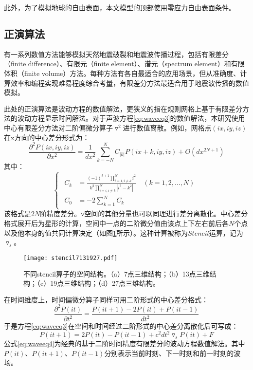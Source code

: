 此外，为了模拟地球的自由表面，本文模型的顶部使用零应力自由表面条件\cite{gottschammer2001accuracy}。

\subsection{正演算法} %
有一系列数值方法能够模拟天然地震破裂和地震波传播过程，包括有限差分（finite difference）、有限元（finite element）、谱元（spectrum element）和有限体积（finite volume）方法。每种方法有各自最适合的应用场景，但从准确度、计算效率和编程实现难易程度综合考量，有限差分方法最适合用于地震波传播的数值模拟。

此处的正演算法是波动方程的数值解法，更狭义的指在规则网格上基于有限差分方法的波动方程显示时间解法。对于声波方程\ref{eq:waveeq3}的数值解法，本研究使用中心有限差分方法对二阶偏微分算子$\triangledown ^2$进行数值离散。例如，网格点$(ix, iy, iz)$在x方向的中心差分形式为：
\begin{equation}
  \frac{\partial ^2 P(ix, iy, iz)}{\partial x^2}=\frac{1}{dx^2}\sum_{k=-N}^N C_{|k|}P(ix+k, iy, iz)+O(dx^{2N+1})
\end{equation}
其中：
\begin{equation}
\left\{\begin{matrix}
\begin{aligned}
C_k &=\frac{(-1)^{k+1}\prod_{i=1,i\neq k}^N i^2}{k^2\prod_{i=i,i\neq k}^N |i^2-k^2|}\quad (k=1,2,\ldots,N) \\
C_0 &=-2\sum_{k=1}^N C_k  
\end{aligned}
\end{matrix}\right.
\end{equation}
该格式是$2N$阶精度差分。$\triangledown$空间的其他分量也可以同理进行差分离散化。中心差分格式展开后为星形的计算，空间中一点的二阶微分值由该点上下左右前后各$N$个点以及他本身的值共同计算决定（如图\ref{fig:stencilstruct}所示）。这种计算被称为$Stencil$运算，记为$\triangledown_s$。

\begin{figure}[ht]
  \centering
  \texttt{[image: stencil7131927.pdf]}
  \caption{不同stencil算子的空间结构\cite{zhang2013autogeneration}。（a）7点三维结构；（b）13点三维结构；（c）19点三维结构；（d）27点三维结构。}
  \label{fig:stencilstruct}
\end{figure}

在时间维度上，时间偏微分算子同样可用二阶形式的中心差分格式：
\begin{equation}
  \frac{\partial ^2 P(it)}{\partial t^2}=\frac{P(it+1)-2P(it)+P(it-1)}{dt^2}
\end{equation}
于是方程\ref{eq:waveeq3}在空间和时间经过二阶形式的中心差分离散化后可写成：
\begin{equation}
  P(it+1)=2P(it)-P(it-1)+c^2dt^2\triangledown_s P(it)+F
  \label{eq:waveeq4}
\end{equation}
公式\ref{eq:waveeq4}为经典的基于二阶时间精度有限差分的波动方程数值解法。其中$P(it)$、$P(it+1)$、$P(it-1)$分别表示当前时刻、下一时刻和前一时刻的波场。

